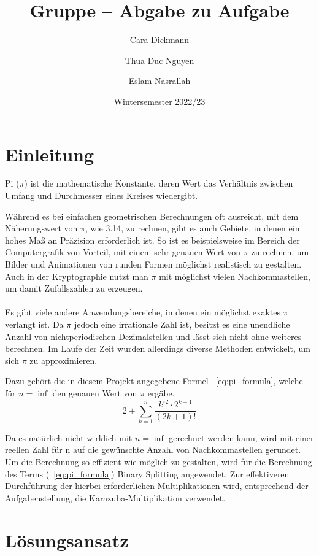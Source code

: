 \documentclass[course=erap]{aspdoc}
\author{Cara Dickmann \and Thua Duc Nguyen \and Eslam Nasrallah}
\date{Wintersemester 2022/23} %
\title{Gruppe \theGroup{} -- Abgabe zu Aufgabe \theNumber}
\begin{document}
\maketitle

\section{Einleitung}
Pi ($\pi$) ist die mathematische Konstante, deren Wert das Verhältnis zwischen Umfang und Durchmesser eines Kreises wiedergibt.

Während es bei einfachen geometrischen Berechnungen oft ausreicht, mit dem Näherungswert von $\pi$, wie 3.14, zu rechnen, gibt es auch Gebiete, in denen ein hohes Maß an Präzision erforderlich ist.
So ist es beispielsweise im Bereich der Computergrafik von Vorteil, mit einem sehr genauen Wert von $\pi$ zu rechnen, um Bilder und Animationen von runden Formen möglichst realistisch zu gestalten.
Auch in der Kryptographie nutzt man $\pi$ mit möglichst vielen Nachkommastellen, um damit Zufallszahlen zu erzeugen. %
\\\\
Es gibt viele andere Anwendungsbereiche, in denen ein möglichst exaktes $\pi$ verlangt ist. Da $\pi$ jedoch eine irrationale Zahl ist, besitzt es eine unendliche Anzahl von nichtperiodischen Dezimalstellen und lässt sich nicht ohne weiteres berechnen.
Im Laufe der Zeit wurden allerdings diverse Methoden entwickelt, um sich $\pi$ zu approximieren.

Dazu gehört die in diesem Projekt angegebene Formel ~\ref{eq:pi_formula}, welche für $n = \inf$ den genauen Wert von $\pi$ ergäbe.
\begin{equation}\label{eq:pi_formula}
2 + \sum_{k=1}^{n} {\frac{k!^2 \cdot 2^{k+1} }{(2k+1)!}}
\end{equation}

Da es natürlich nicht wirklich mit $n = \inf$ gerechnet werden kann, wird mit einer reellen Zahl für n auf die gewünschte Anzahl von Nachkommastellen gerundet.
Um die Berechnung so effizient wie möglich zu gestalten, wird für die Berechnung des Terms (~\ref{eq:pi_formula}) Binary Splitting angewendet.
Zur effektiveren Durchführung der hierbei erforderlichen Multiplikationen wird, entsprechend der Aufgabenstellung, die Karazuba-Multiplikation verwendet.


\section{Lösungsansatz}
\end{document}
